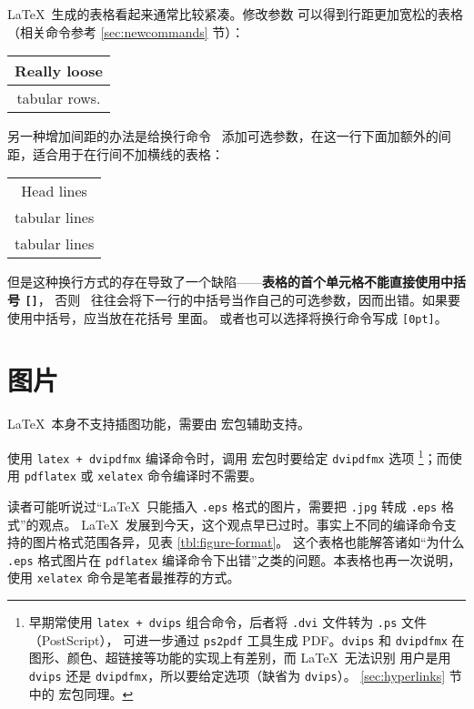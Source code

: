 \LaTeX\ 生成的表格看起来通常比较紧凑。修改参数  可以得到行距更加宽松的表格
（相关命令参考 \ref{sec:newcommands} 节）：
\begin{example}
\renewcommand\arraystretch{1.8}
\begin{tabular}{|c|}
  \hline
  Really loose \\ \hline
  tabular rows.\\ \hline
\end{tabular}
\end{example}

另一种增加间距的办法是给换行命令 \crcmd\ 添加可选参数，在这一行下面加额外的间距，适合用于在行间不加横线的表格：
\begin{example}
\begin{tabular}{c}
  \hline
  Head lines \\[6pt]
  tabular lines \\
  tabular lines \\ \hline
\end{tabular}
\end{example}

但是这种换行方式的存在导致了一个缺陷——\textbf{表格的首个单元格不能直接使用中括号 \texttt{[]}}，
否则 \crcmd\ 往往会将下一行的中括号当作自己的可选参数，因而出错。如果要使用中括号，应当放在花括号 \marg*{} 里面。
或者也可以选择将换行命令写成 \crcmd\texttt{[0pt]}。


\section{图片}\label{sec:figures}


\LaTeX\ 本身不支持插图功能，需要由  宏包辅助支持。

使用 \texttt{latex + dvipdfmx} 编译命令时，调用  宏包时要给定 \texttt{dvipdfmx} 选项%
\footnote{早期常使用 \texttt{latex + dvips} 组合命令，后者将 \texttt{.dvi} 文件转为 \texttt{.ps} 文件（PostScript），
可进一步通过 \texttt{ps2pdf} 工具生成 PDF。\texttt{dvips} 和 \texttt{dvipdfmx} 在图形、颜色、超链接等功能的实现上有差别，而 \LaTeX\ 无法识别
用户是用 \texttt{dvips} 还是 \texttt{dvipdfmx}，所以要给定选项（缺省为 \texttt{dvips}）。
\ref{sec:hyperlinks} 节中的  宏包同理。}；而使用 \texttt{pdflatex} 或 \texttt{xelatex} 命令编译时不需要。

读者可能听说过“\LaTeX\ 只能插入 \texttt{.eps} 格式的图片，需要把 \texttt{.jpg} 转成 \texttt{.eps} 格式”的观点。
\LaTeX\ 发展到今天，这个观点早已过时。事实上不同的编译命令支持的图片格式范围各异，见表 \ref{tbl:figure-format}。
这个表格也能解答诸如“为什么 \texttt{.eps} 格式图片在 \texttt{pdflatex} 编译命令下出错”之类的问题。本表格也再一次说明，使用
\texttt{xelatex} 命令是笔者最推荐的方式。

